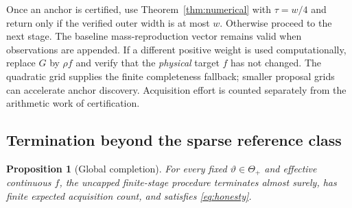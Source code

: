 \documentclass[10pt]{amsart}
\newtheorem{proposition}[theorem]{Proposition}
\theoremstyle{definition}
\theoremstyle{remark}
\theoremstyle{plain}
\newcommand{\ThetaAll}{\Theta_+}
\begin{document}
Once an anchor is certified, use Theorem~\ref{thm:numerical} with $\tau=w/4$ and return only if the verified outer width is at most $w$. Otherwise proceed to the next stage. The baseline mass-reproduction vector remains valid when observations are appended. If a different positive weight is used computationally, replace $G$ by $\rho f$ and verify that the \emph{physical} target $f$ has not changed. The quadratic grid supplies the finite completeness fallback; smaller proposal grids can accelerate anchor discovery. Acquisition effort is counted separately from the arithmetic work of certification.

\subsection{Termination beyond the sparse reference class}
\begin{proposition}[Global completion]\label{prop:complete}
For every fixed $\vartheta\in\ThetaAll$ and effective continuous $f$, the uncapped finite-stage procedure terminates almost surely, has finite expected acquisition count, and satisfies \eqref{eq:honesty}.
\end{proposition}
\end{document}
